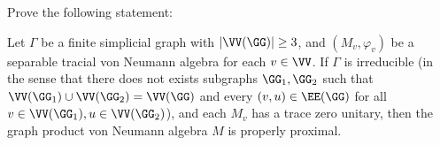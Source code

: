 Prove the following statement:

Let $\Gamma$ be a finite simplicial graph with $|\VV(\GG)|\geq 3$, and $(M_v,\varphi_v)$ be a separable tracial von Neumann algebra for each $v\in \VV$. If $\Gamma$ is irreducible (in the sense that there does not exists subgraphs $\GG_1,\GG_2$ such that $ \VV(\GG_1)\cup \VV(\GG_2)=\VV(\GG) $ and every $(v,u)\in \EE(\GG) $ for all $v\in\VV(\GG_1),u\in \VV(\GG_2)$), and each $M_v$ has a trace zero unitary, then the graph product von Neumann algebra $M$ is properly proximal.